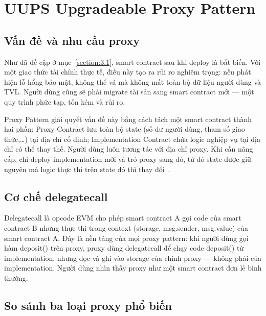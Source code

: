 \documentclass[../DoAn.tex]{subfiles}
\begin{document}
\section{UUPS Upgradeable Proxy Pattern}
\label{section:3.4}


\subsection{Vấn đề và nhu cầu proxy}


Như đã đề cập ở mục~\ref{section:3.1}, smart contract sau khi deploy là bất biến. Với một giao thức tài chính thực tế, điều này tạo ra rủi ro nghiêm trọng: nếu phát hiện lỗ hổng bảo mật, không thể vá mà không mất toàn bộ dữ liệu người dùng và TVL. Người dùng cũng sẽ phải migrate tài sản sang smart contract mới --- một quy trình phức tạp, tốn kém và rủi ro.

Proxy Pattern giải quyết vấn đề này bằng cách tách một smart contract thành hai phần: Proxy Contract lưu toàn bộ state (số dư người dùng, tham số giao thức,…) tại địa chỉ cố định; Implementation Contract chứa logic nghiệp vụ tại địa chỉ có thể thay thế. Người dùng luôn tương tác với địa chỉ proxy. Khi cần nâng cấp, chỉ deploy implementation mới và trỏ proxy sang đó, từ đó state được giữ nguyên mà logic thực thi trên state đó thì thay đổi~\cite{EIP1822,OpenZeppelinDocs}.

\subsection{Cơ chế delegatecall}


Delegatecall là opcode EVM cho phép smart contract A gọi code của smart contract B nhưng thực thi trong context (storage, msg.sender, msg.value) của smart contract A. Đây là nền tảng của mọi proxy pattern: khi người dùng gọi hàm deposit() trên proxy, proxy dùng delegatecall để chạy code deposit() từ implementation, nhưng đọc và ghi vào storage của chính proxy --- không phải của implementation. Người dùng nhìn thấy proxy như một smart contract đơn lẻ bình thường.

\subsection{So sánh ba loại proxy phổ biến}
\end{document}
